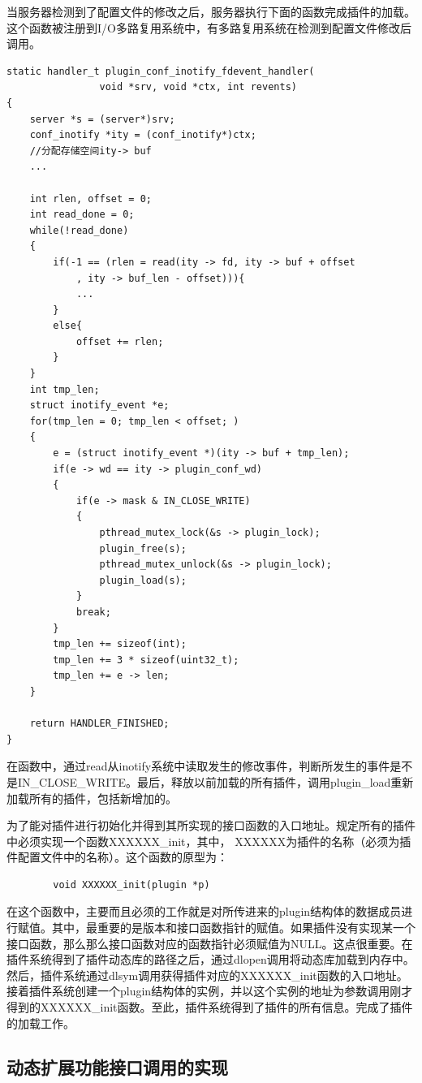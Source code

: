 \documentclass[12pt, twoside, a4paper, xetex]{report}
\begin{document}
	当服务器检测到了配置文件的修改之后，服务器执行下面的函数完成插件的加载。这个函数被注册到I/O多路复用系统中，有多路复用系统在检测到配置文件修改后调用。
	
	\begin{verbatim}
static handler_t plugin_conf_inotify_fdevent_handler(
				void *srv, void *ctx, int revents)
{
	server *s = (server*)srv;
	conf_inotify *ity = (conf_inotify*)ctx;
	//分配存储空间ity-> buf
	...
	
	int rlen, offset = 0;
	int read_done = 0;
	while(!read_done)
	{
		if(-1 == (rlen = read(ity -> fd, ity -> buf + offset
			, ity -> buf_len - offset))){
			...
		}
		else{
			offset += rlen;
		}
	}
	int tmp_len;
	struct inotify_event *e;
	for(tmp_len = 0; tmp_len < offset; )
	{
		e = (struct inotify_event *)(ity -> buf + tmp_len);
		if(e -> wd == ity -> plugin_conf_wd)
		{
			if(e -> mask & IN_CLOSE_WRITE)
			{
				pthread_mutex_lock(&s -> plugin_lock);
				plugin_free(s);
				pthread_mutex_unlock(&s -> plugin_lock);
				plugin_load(s);
			}
			break;
		}
		tmp_len += sizeof(int); 			
		tmp_len += 3 * sizeof(uint32_t);	
		tmp_len += e -> len;
	}
	
	return HANDLER_FINISHED;
}
	\end{verbatim}
	在函数中，通过read从inotify系统中读取发生的修改事件，判断所发生的事件是不是IN\_CLOSE\_WRITE。最后，释放以前加载的所有插件，调用plugin\_load重新加载所有的插件，包括新增加的。
	
	为了能对插件进行初始化并得到其所实现的接口函数的入口地址。规定所有的插件中必须实现一个函数XXXXXX\_init，其中，	XXXXXX为插件的名称（必须为插件配置文件中的名称）。这个函数的原型为：
	\begin{verbatim}
        void XXXXXX_init(plugin *p)
	\end{verbatim}
	
	在这个函数中，主要而且必须的工作就是对所传进来的plugin结构体的数据成员进行赋值。其中，最重要的是版本和接口函数指针的赋值。如果插件没有实现某一个接口函数，那么那么接口函数对应的函数指针必须赋值为NULL。这点很重要。在插件系统得到了插件动态库的路径之后，通过dlopen调用将动态库加载到内存中。然后，插件系统通过dlsym调用获得插件对应的XXXXXX\_init函数的入口地址。接着插件系统创建一个plugin结构体的实例，并以这个实例的地址为参数调用刚才得到的XXXXXX\_init函数。至此，插件系统得到了插件的所有信息。完成了插件的加载工作。
	
\subsection{动态扩展功能接口调用的实现}
\end{document}
